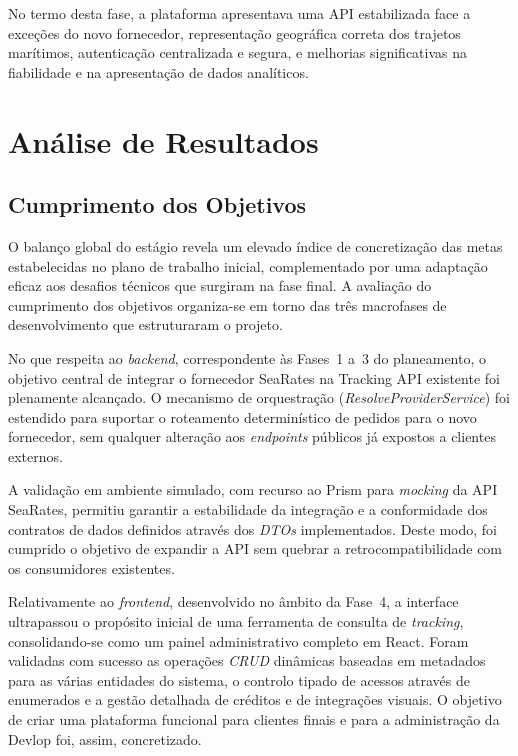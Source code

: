 \documentclass[a4paper,12pt]{report}
\begin{document}
No termo desta fase, a plataforma apresentava uma API estabilizada face a exceções do novo fornecedor, representação geográfica correta dos trajetos marítimos, autenticação centralizada e segura, e melhorias significativas na fiabilidade e na apresentação de dados analíticos.

\chapter{Análise de Resultados}

\section{Cumprimento dos Objetivos}

O balanço global do estágio revela um elevado índice de concretização das metas estabelecidas no plano de trabalho inicial, complementado por uma adaptação eficaz aos desafios técnicos que surgiram na fase final. A avaliação do cumprimento dos objetivos organiza-se em torno das três macrofases de desenvolvimento que estruturaram o projeto.

No que respeita ao \textit{backend}, correspondente às Fases~1 a~3 do planeamento, o objetivo central de integrar o fornecedor SeaRates na Tracking API existente foi plenamente alcançado. O mecanismo de orquestração (\textit{ResolveProviderService}) foi estendido para suportar o roteamento determinístico de pedidos para o novo fornecedor, sem qualquer alteração aos \textit{endpoints} públicos já expostos a clientes externos.

A validação em ambiente simulado, com recurso ao Prism para \textit{mocking} da API SeaRates, permitiu garantir a estabilidade da integração e a conformidade dos contratos de dados definidos através dos \textit{DTOs} implementados. Deste modo, foi cumprido o objetivo de expandir a API sem quebrar a retrocompatibilidade com os consumidores existentes.

Relativamente ao \textit{frontend}, desenvolvido no âmbito da Fase~4, a interface ultrapassou o propósito inicial de uma ferramenta de consulta de \textit{tracking}, consolidando-se como um painel administrativo completo em React. Foram validadas com sucesso as operações \textit{CRUD} dinâmicas baseadas em metadados para as várias entidades do sistema, o controlo tipado de acessos através de enumerados e a gestão detalhada de créditos e de integrações visuais. O objetivo de criar uma plataforma funcional para clientes finais e para a administração da Devlop foi, assim, concretizado.
\end{document}
